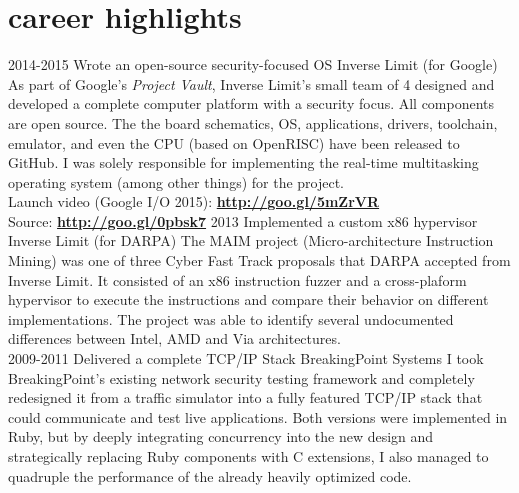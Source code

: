 \documentclass[]{friggeri-cv}
\begin{document}
\section{career highlights}

\begin{entrylist}
  \entry
      {2014-2015}
      {Wrote an open-source security-focused OS}
      {Inverse Limit (for Google)}
      {
        As part of Google's \emph{Project Vault}, Inverse Limit's small team of 4 designed and developed a complete computer platform with a security focus. All components are open source. The the board schematics, OS, applications, drivers, toolchain, emulator, and even the CPU (based on OpenRISC) have been released to GitHub. I was solely responsible for implementing the real-time multitasking operating system (among other things) for the project.\\
%        

        Launch video (Google I/O 2015): \hfill \href{http://goo.gl/5mZrVR}{\textbf{http://goo.gl/5mZrVR}}\\
        Source: \hfill \href{http://goo.gl/0pbsk7}{\textbf{http://goo.gl/0pbsk7}}
      }
  \entry
      {2013}
      {Implemented a custom x86 hypervisor}
      {Inverse Limit (for DARPA)}
      {The MAIM project (Micro-architecture Instruction Mining) was one of three Cyber Fast Track proposals that DARPA accepted from Inverse Limit. It consisted of an x86 instruction fuzzer and a cross-plaform hypervisor to execute the instructions and compare their behavior on different implementations. The project was able to identify several undocumented differences between Intel, AMD and Via architectures.\\

      }
  \entry
      {2009-2011}
      {Delivered a complete TCP/IP Stack}
      {BreakingPoint Systems}
      {I took BreakingPoint's existing network security testing framework and completely redesigned it from a traffic simulator into a fully featured TCP/IP stack that could communicate and test live applications. Both versions were implemented in Ruby, but by deeply integrating concurrency into the new design and strategically replacing Ruby components with C extensions, I also managed to quadruple the performance of the already heavily optimized code.}
\end{entrylist}
\newpage
\end{document}
